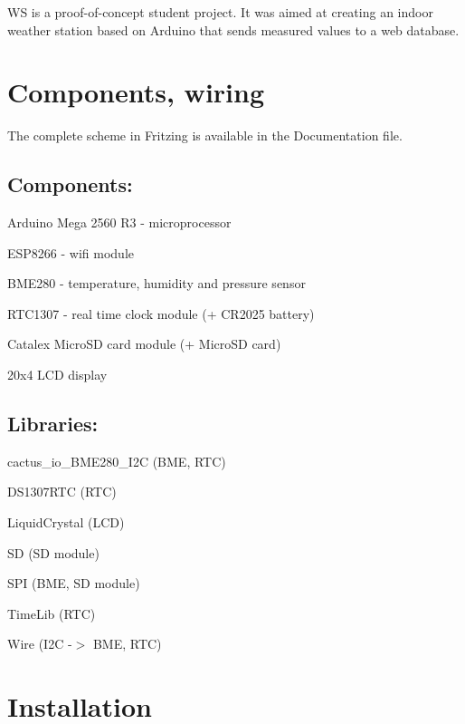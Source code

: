 WS is a proof-\/of-\/concept student project. It was aimed at creating an indoor weather station based on Arduino that sends measured values to a web database.

\section*{Components, wiring}

 The complete scheme in Fritzing is available in the Documentation file.

\subsection*{Components\+:}


\begin{DoxyItemize}
\item Arduino Mega 2560 R3 -\/ microprocessor
\item E\+S\+P8266 -\/ wifi module
\item B\+M\+E280 -\/ temperature, humidity and pressure sensor
\item R\+T\+C1307 -\/ real time clock module (+ C\+R2025 battery)
\item Catalex Micro\+SD card module (+ Micro\+SD card)
\item 20x4 L\+CD display
\end{DoxyItemize}

\subsection*{Libraries\+:}


\begin{DoxyItemize}
\item cactus\+\_\+io\+\_\+\+B\+M\+E280\+\_\+\+I2C (B\+ME, R\+TC)
\item D\+S1307\+R\+TC (R\+TC)
\item Liquid\+Crystal (L\+CD)
\item SD (SD module)
\item S\+PI (B\+ME, SD module)
\item Time\+Lib (R\+TC)
\item Wire (I2C -\/$>$ B\+ME, R\+TC)
\end{DoxyItemize}

\section*{Installation}

